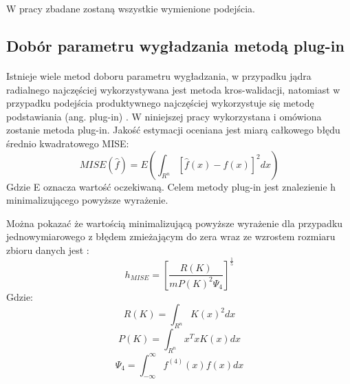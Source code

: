 \documentclass[a4paper,12pt,twoside]{article}
\begin{document}
W pracy zbadane zostaną wszystkie wymienione podejścia. 

\subsection{Dobór parametru wygładzania metodą plug-in}
\paragraph{}
Istnieje wiele metod doboru parametru wygładzania, w przypadku jądra radialnego najczęściej wykorzystywana jest metoda kros-walidacji, natomiast w przypadku podejścia produktywnego najczęściej wykorzystuje się metodę podstawiania (ang. plug-in) \cite{kde}. W niniejszej pracy wykorzystana i omówiona zostanie metoda plug-in. 
Jakość estymacji oceniana jest miarą całkowego błędu średnio kwadratowego MISE:
\begin{equation}  MISE(\hat{f})=E\left(\int_{R^n}\left[\hat{f}(x)-f(x)\right]^2 dx\right)
\end{equation}
Gdzie E oznacza wartość oczekiwaną. Celem metody plug-in jest znalezienie h minimalizującego powyższe wyrażenie. 

Można pokazać że wartością minimalizującą powyższe wyrażenie dla przypadku jednowymiarowego z błędem zmieżającym do zera wraz ze wzrostem rozmiaru zbioru danych jest \cite{kde2}:
\begin{equation}  h_{MISE}=\left[ \frac{R(K)}{mP(K)^2\Psi_{4}}\right]^\frac{1}{5} \label{eqn2}
\end{equation}
Gdzie:
\begin{equation}  R(K)=\int_{R^n}K(x)^2dx
\end{equation}
\begin{equation}  P(K)=\int_{R^n}x^TxK(x)dx
\end{equation}
\begin{equation} \Psi_{4}=\int^{\infty}_{-\infty }f^{(4)}(x)f(x)dx
\end{equation}
\end{document}
